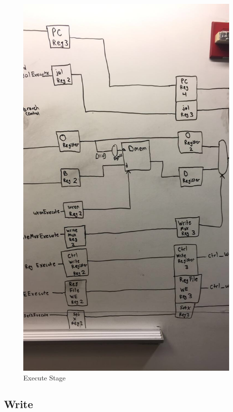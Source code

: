 \documentclass[letterpaper]{article} %
\begin{document}
  \begin{figure}[!htb]
        \includegraphics[scale=.45]{Memory.jpg}
        \caption{Execute Stage}
        \label{fig:2}
    \end{figure}
    
       \FloatBarrier

\subsection{Write}
\end{document}
